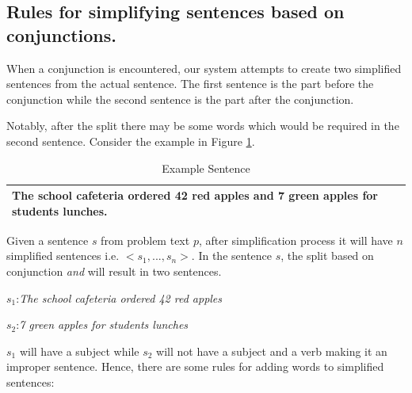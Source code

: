 \documentclass[11pt]{article}
\begin{document}
\subsection{Rules for simplifying sentences based on conjunctions.}\label{sec:simplifyingrules}
 When a conjunction is encountered, our system attempts to create two simplified sentences from the actual sentence. The first sentence is the part before the conjunction while the second sentence is the part after the conjunction.

Notably, after the split there may be some words which would be required in the second sentence. Consider the example in Figure \ref{figure:8}.

\begin{table}[h!]
\centering
\begin{tabular}{ | m{25em} | }
\hline
The school cafeteria ordered 42 red apples and 7 green apples for students lunches.\\
\hline
\end{tabular}
\caption{Example Sentence}
\label{figure:8}
\end{table}

Given a sentence \begin{math}s\end{math} from problem text \begin{math}p\end{math}, after simplification process it will have  \begin{math}n\end{math} simplified sentences i.e. \begin{math}<s_{1},..., s_{n}>\end{math}. In the sentence \begin{math}s\end{math}, the split based on conjunction \textit{and} will result in two sentences. 

\begin{math}s_{1}\end{math}:\textit{The school cafeteria ordered 42 red apples}

\begin{math}s_{2}\end{math}:\textit{7 green apples for students lunches}


\begin{math}s_{1}\end{math} will have a subject while \begin{math}s_{2}\end{math} will not have a subject and a verb making it an improper sentence. Hence, there are some rules for adding words to simplified sentences:
\end{document}
